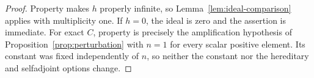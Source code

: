 \begin{proof}
Property \propP{} makes $h$ properly infinite, so
Lemma~\ref{lem:ideal-comparison} applies with multiplicity one.
If $h=0$, the ideal is zero and the assertion is immediate.
For exact $C$, property \propP{} is precisely the amplification
hypothesis of Proposition~\ref{prop:perturbation} with $n=1$ for every
scalar positive element.  Its constant was fixed independently of $n$,
so neither the constant nor the hereditary and selfadjoint options change.
\end{proof}
